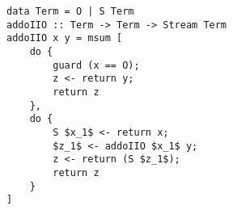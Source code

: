 \begin{figure}[h]
\centering
\begin{minipage}{0.9\columnwidth}
  \begin{lstlisting}[frame=tb]
data Term = O | S Term
addoIIO :: Term -> Term -> Stream Term
addoIIO x y = msum [
    do {
        guard (x == O);
        z <- return y;
        return z
    },
    do {
        S $x_1$ <- return x;
        $z_1$ <- addoIIO $x_1$ y;
        z <- return (S $z_1$);
        return z
    }
]
  \end{lstlisting}
\end{minipage}
\end{figure}


